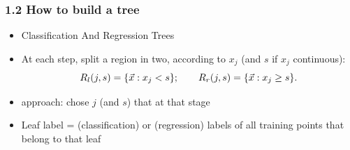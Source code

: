 
\begin{frame}
  \frametitle{1.2 How to build a tree}
  \begin{itemize}
    \item {} Classification And Regression Trees
    \item At each step, split a region in two, according to  $x_j$ (and  $s$ if $x_j$ continuous):
      \begin{equation*}
        R_l(j, s) = \{\vec{x} : x_j < s\} ; \hspace{2em} R_r(j, s) = \{\vec{x} : x_j \geq s\}.
      \end{equation*}
    \item {} approach: chose $j$ (and $s$) that  at that stage
    \item  Leaf label =  (classification) or  (regression) labels of all training points that belong to that leaf
    \end{itemize}
\end{frame}

